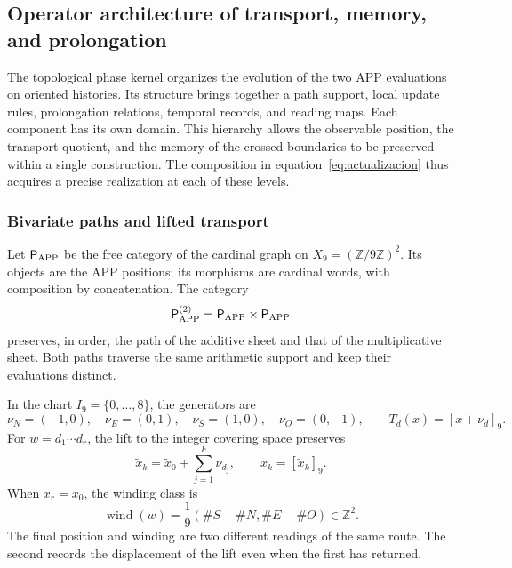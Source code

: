 \subsection{Operator architecture of transport, memory, and prolongation}
\label{ii:tpk-arquitectura}

The topological phase kernel organizes the evolution of the two APP
evaluations on oriented histories. Its structure brings together a path support,
local update rules, prolongation relations, temporal
records, and reading maps. Each component has its own
domain. This hierarchy allows the observable position, the transport
quotient, and the memory of the crossed boundaries to be preserved within
a single construction. The composition in equation~\eqref{eq:actualizacion}
thus acquires a precise realization at each of these levels.

\subsubsection{Bivariate paths and lifted transport}

Let \(\mathsf P_{\rm APP}\) be the free category of the cardinal graph on
\(X_9=(\mathbb Z/9\mathbb Z)^2\). Its objects are the APP positions;
its morphisms are cardinal words, with composition by
concatenation. The category
\[
 \mathsf P_{\rm APP}^{(2)}
 =\mathsf P_{\rm APP}\times\mathsf P_{\rm APP}
\]
preserves, in order, the path of the additive sheet and that of the
multiplicative sheet. Both paths traverse the same arithmetic support and
keep their evaluations distinct.

In the chart \(I_9=\{0,\ldots,8\}\), the generators are
\[
 \nu_N=(-1,0),\quad\nu_E=(0,1),\quad
 \nu_S=(1,0),\quad\nu_O=(0,-1),
 \qquad T_d(x)=[x+\nu_d]_9.
\]
For \(w=d_1\cdots d_r\), the lift to the integer covering space preserves
\[
 \widetilde x_k=\widetilde x_0+\sum_{j=1}^{k}\nu_{d_j},
 \qquad x_k=[\widetilde x_k]_9.
\]
When \(x_r=x_0\), the winding class is
\begin{equation}
 \operatorname{wind}(w)
 =\frac{1}{9}(\#S-\#N,\#E-\#O)\in\mathbb Z^2.
 \label{ii:tpk-enrollamiento}
\end{equation}
The final position and winding are two different readings of the
same route. The second records the displacement of the lift even
when the first has returned.

